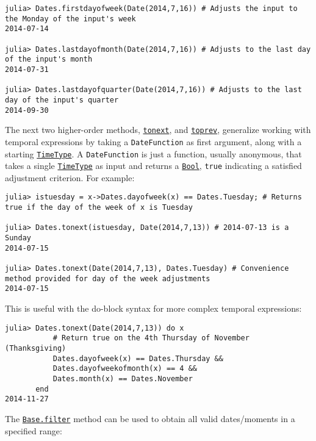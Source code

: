 \begin{verbatim}
julia> Dates.firstdayofweek(Date(2014,7,16)) # Adjusts the input to the Monday of the input's week
2014-07-14

julia> Dates.lastdayofmonth(Date(2014,7,16)) # Adjusts to the last day of the input's month
2014-07-31

julia> Dates.lastdayofquarter(Date(2014,7,16)) # Adjusts to the last day of the input's quarter
2014-09-30
\end{verbatim}



The next two higher-order methods, \hyperlink{9410879287453023176}{\texttt{tonext}}, and \hyperlink{5295237512711135506}{\texttt{toprev}}, generalize working with temporal expressions by taking a \texttt{DateFunction} as first argument, along with a starting \hyperlink{4438614350756187528}{\texttt{TimeType}}. A \texttt{DateFunction} is just a function, usually anonymous, that takes a single \hyperlink{4438614350756187528}{\texttt{TimeType}} as input and returns a \hyperlink{46725311238864537}{\texttt{Bool}}, \texttt{true} indicating a satisfied adjustment criterion. For example:




\begin{verbatim}
julia> istuesday = x->Dates.dayofweek(x) == Dates.Tuesday; # Returns true if the day of the week of x is Tuesday

julia> Dates.tonext(istuesday, Date(2014,7,13)) # 2014-07-13 is a Sunday
2014-07-15

julia> Dates.tonext(Date(2014,7,13), Dates.Tuesday) # Convenience method provided for day of the week adjustments
2014-07-15
\end{verbatim}



This is useful with the do-block syntax for more complex temporal expressions:




\begin{verbatim}
julia> Dates.tonext(Date(2014,7,13)) do x
           # Return true on the 4th Thursday of November (Thanksgiving)
           Dates.dayofweek(x) == Dates.Thursday &&
           Dates.dayofweekofmonth(x) == 4 &&
           Dates.month(x) == Dates.November
       end
2014-11-27
\end{verbatim}



The \hyperlink{11445961893478569145}{\texttt{Base.filter}} method can be used to obtain all valid dates/moments in a specified range:




